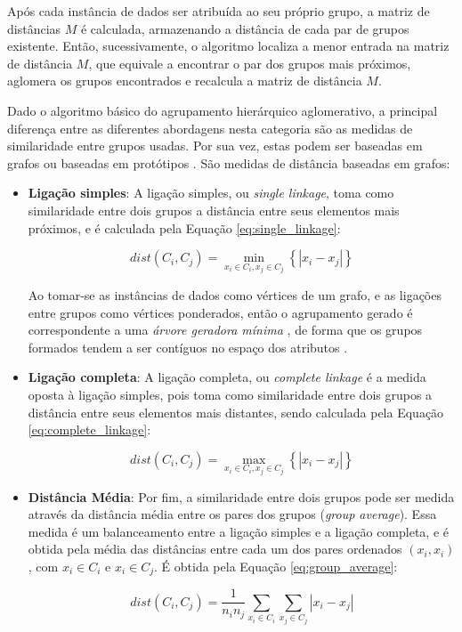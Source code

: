 Após cada instância de dados ser atribuída ao seu próprio grupo, a matriz de
distâncias $M$ é calculada, armazenando a distância de cada par de grupos
existente. Então, sucessivamente, o algoritmo localiza a menor entrada na matriz
de distância $M$, que equivale a encontrar o par dos grupos mais próximos,
aglomera os grupos encontrados e recalcula a matriz de distância $M$.

Dado o algoritmo básico do agrupamento hierárquico aglomerativo, a principal
diferença entre as diferentes abordagens nesta categoria são as medidas de 
similaridade entre grupos usadas. Por sua vez, estas podem ser baseadas em
grafos ou baseadas em protótipos \cite{tan2009introducao}. São medidas de
distância baseadas em grafos:

\begin{itemize}
	\item \textbf{Ligação simples}: A ligação simples, ou \emph{single linkage},
	toma como similaridade entre dois grupos a distância entre seus elementos 
	mais próximos, e é calculada pela Equação \ref{eq:single_linkage}:
	
	\begin{equation}
		dist\left(C_i,C_j\right) =
			\min_{x_i \in C_i , x_j \in C_j}
				{\left\{ \left| x_i - x_j \right| \right\}}
		\label{eq:single_linkage}
	\end{equation}
	
	
	Ao tomar-se as instâncias de dados como vértices de um grafo, e as ligações 
	entre grupos como vértices ponderados, então o agrupamento gerado é
	correspondente a uma \emph{árvore geradora mínima} \cite{han2011data}, de
	forma que os grupos formados tendem a ser contíguos no espaço dos atributos
	\cite{tan2009introducao}.
	
	\item \textbf{Ligação completa}: A ligação completa, ou
	\emph{complete linkage} é a medida oposta à ligação simples, pois toma como 
	similaridade entre dois grupos a distância entre seus elementos mais
	distantes, sendo calculada pela Equação \ref{eq:complete_linkage}:
	
	\begin{equation}
		dist\left(C_i,C_j\right) =
			\max_{x_i \in C_i , x_j \in C_j}
				{\left\{ \left| x_i - x_j \right| \right\}}
		\label{eq:complete_linkage}
	\end{equation}
	
	
	\item \textbf{Distância Média}: Por fim, a similaridade entre dois grupos pode
	ser medida através da distância média entre os pares dos grupos
	(\emph{group average}). Essa medida é um balanceamento entre a ligação simples
	e a ligação completa, e é obtida pela média das distâncias entre cada um dos
	pares ordenados $(x_i,x_i)$, com $x_i \in C_i$ e $x_i \in C_j$. É obtida
	pela Equação \ref{eq:group_average}:
	
	\begin{equation}
		dist\left(C_i,C_j\right) =
			\frac{1}{n_in_j} 
			\sum_{x_i \in C_i}{
				\sum_{x_j \in C_j}{
					\left| x_i - x_j \right|
				}
			}
		\label{eq:group_average}
	\end{equation}
	
\end{itemize}

